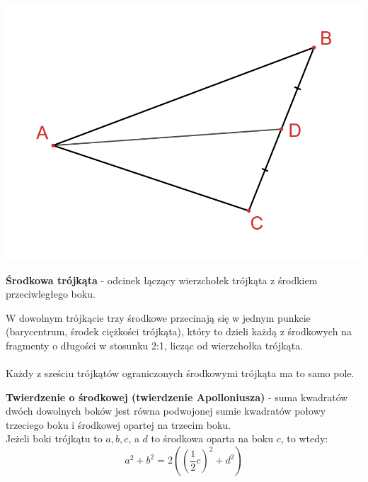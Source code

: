 \documentclass[14pt,a4paper]{extarticle}
\begin{document}
\begin{center}\includegraphics[scale=0.5]{geometria/środkowa trójkąta.png}\end{center}
\noindent \textbf{Środkowa trójkąta} - odcinek łączący wierzchołek trójkąta z środkiem przeciwległego boku.\\

\MoveBelowBox\unskip

\noindent W dowolnym trójkącie trzy środkowe przecinają się w jednym punkcie (barycentrum, środek ciężkości trójkąta), który to dzieli każdą
z środkowych na fragmenty o długości w stosunku 2:1, licząc od wierzchołka trójkąta.\\\\
Każdy z sześciu trójkątów ograniczonych środkowymi trójkąta ma to samo pole.

\MoveBelowBox
\noindent \textbf{Twierdzenie o środkowej (twierdzenie Apolloniusza)} - suma kwadratów dwóch dowolnych
boków jest równa podwojonej sumie kwadratów połowy trzeciego boku i środkowej opartej na trzecim boku.\\
Jeżeli boki trójkątu to $a, b, c$, a $d$ to środkowa oparta na boku $c$, to wtedy:
$$a^{2}+b^{2} = 2\left(\left(\frac{1}{2}c\right)^{2} + d^{2}\right)$$

\newpage
\end{document}
